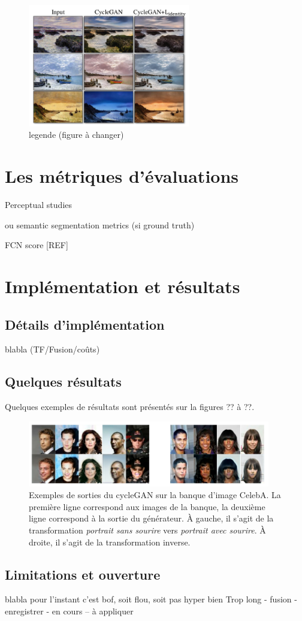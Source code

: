 \begin{figure}[!h]
\centering
\includegraphics[width=200pt]{"images/Lident"}
\caption{legende (figure à changer)}
\end{figure}


\section{Les métriques d'évaluations}

Perceptual studies 

ou semantic segmentation metrics (si ground truth)

FCN score [REF]


\section{Implémentation et résultats}

\subsection{Détails d'implémentation}

blabla (TF/Fusion/coûts)

\subsection{Quelques résultats}

Quelques exemples de résultats sont présentés sur la figures ?? à ??.

\begin{figure}[!h]
\centering
\includegraphics[width=300pt]{"images/cycle"}
\caption{Exemples de sorties du cycleGAN sur la banque d'image CelebA. La première ligne correspond aux images de la banque, la deuxième ligne correspond à la sortie du générateur. À gauche, il s'agit de la transformation \textit{portrait sans sourire} vers \textit{portrait avec sourire}. À droite, il s'agit de la transformation inverse.}
\end{figure}

\subsection{Limitations et ouverture}

blabla pour l'instant c'est bof, soit flou, soit pas hyper bien
Trop long - fusion - enregistrer - en cours
-- à appliquer